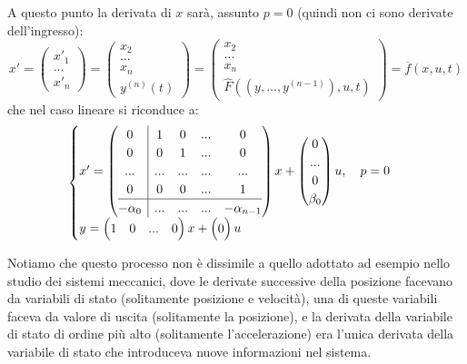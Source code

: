 \documentclass[a4paper,11pt]{article}
\begin{document}
A questo punto la derivata di $x$ sarà, assunto $p = 0$ (quindi non ci sono derivate dell'ingresso): 
$$
x' = \begin{pmatrix}
x'_1 \\
... \\
x'_n
\end{pmatrix} = \begin{pmatrix}
x_2 \\
... \\
x_n \\ 
y^{(n)}(t)
\end{pmatrix}
= \begin{pmatrix}
x_2 \\
... \\
x_n \\
\hat{F} \left( (y, ..., y^{(n - 1)}), u, t \right)
\end{pmatrix}
= \overline{f}(x, u, t)
$$
che nel caso lineare si riconduce a:
\[
	\begin{cases}	
x' = \left(\begin{array}{@{}c | cccc@{}}
	0 & 1 & 0 & ... & 0 \\
	0 & 0 & 1 & ... & 0 \\
	... & ... & ... & ... & ... \\
	0 & 0 & 0 & ... & 1 \\
	\hline
	-\alpha_0 & ... & ... & ... & -\alpha_{n - 1}
\end{array}\right)
x + \begin{pmatrix}
0 \\
... \\
0 \\
\beta_0
\end{pmatrix} u, \quad p = 0 \\ 
y = \begin{pmatrix}
	1 & 0 & ... & 0
\end{pmatrix} x + \begin{pmatrix}
0
\end{pmatrix} u
	\end{cases}
\]

Notiamo che questo processo non è dissimile a quello adottato ad esempio nello studio dei sistemi meccanici, dove le derivate successive della posizione facevano da variabili di stato (solitamente posizione e velocità), una di queste variabili faceva da valore di uscita (solitamente la posizione), e la derivata della variabile di stato di ordine più alto (solitamente l'accelerazione) era l'unica derivata della variabile di stato che introduceva nuove informazioni nel sistema.
\end{document}
